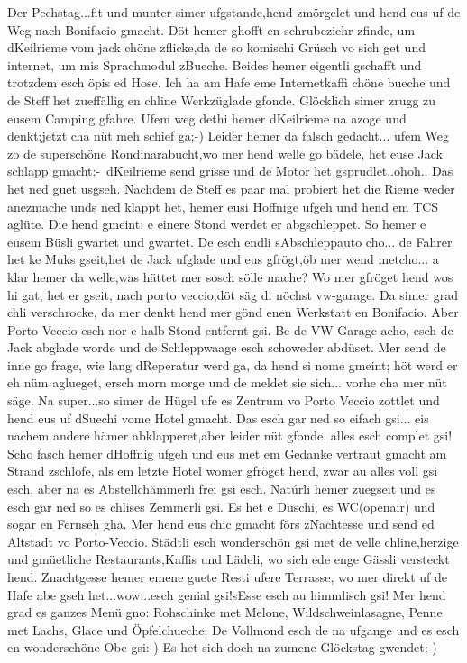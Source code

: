 Der Pechstag...fit und munter simer ufgstande,hend zmörgelet und hend eus uf de Weg nach Bonifacio gmacht.
Döt hemer ghofft en schrubeziehr zfinde, um dKeilrieme vom jack chöne zflicke,da de so komischi Grüsch vo sich get und internet, um mis Sprachmodul zBueche.
Beides hemer eigentli gschafft und trotzdem esch öpis ed Hose.
Ich ha am Hafe eme Internetkaffi chöne bueche und de Steff het zueffällig en chline Werkzüglade gfonde.
Glöcklich simer zrugg zu eusem Camping gfahre.
Ufem weg dethi hemer dKeilrieme na azoge und denkt;jetzt cha nüt meh schief ga;-) Leider hemer da falsch gedacht...
ufem Weg zo de superschöne Rondinarabucht,wo mer hend welle go bädele, het euse Jack schlapp gmacht:-\ dKeilrieme send grisse und de Motor het gsprudlet..ohoh..
Das het ned guet usgseh.
Nachdem de Steff es paar mal probiert het die Rieme weder anezmache unds ned klappt het, hemer eusi Hoffnige ufgeh und hend em TCS aglüte.
Die hend gmeint: e einere Stond werdet er abgschleppet.
So hemer e eusem Büsli gwartet und gwartet.
De esch endli sAbschleppauto cho...
de Fahrer het ke Muks gseit,het de Jack ufglade und eus gfrögt,öb mer wend metcho...
a klar hemer da welle,was hättet mer sosch sölle mache? Wo mer gfröget hend wos hi gat, het er gseit, nach porto veccio,döt säg di nöchst vw-garage.
Da simer grad chli verschrocke, da mer denkt hend mer gönd enen Werkstatt en Bonifacio.
Aber Porto Veccio esch nor e halb Stond entfernt gsi.
Be de VW Garage acho, esch de Jack abglade worde und de Schleppwaage esch schoweder abdüset.
Mer send de inne go frage, wie lang dReperatur werd ga, da hend si nome gmeint; höt werd er eh nüm aglueget, ersch morn morge und de meldet sie sich...
vorhe cha mer nüt säge.
Na super...so simer de Hügel ufe es Zentrum vo Porto Veccio zottlet und hend eus uf dSuechi vome Hotel gmacht.
Das esch gar ned so eifach gsi...
eis nachem andere hämer abklapperet,aber leider nüt gfonde, alles esch complet gsi! Scho fasch hemer dHoffnig ufgeh und eus met em Gedanke vertraut gmacht am Strand zschlofe, als em letzte Hotel womer gfröget hend, zwar au alles voll gsi esch, aber na es Abstellchämmerli frei gsi esch.
Natúrli hemer zuegseit und es esch gar ned so es chlises Zemmerli gsi.
Es het e Duschi, es WC(openair) und sogar en Fernseh gha.
Mer hend eus chic gmacht förs zNachtesse und send ed Altstadt vo Porto-Veccio.
Städtli esch wonderschön gsi met de velle chline,herzige und gmüetliche Restaurants,Kaffis und Lädeli, wo sich ede enge Gässli versteckt hend.
Znachtgesse hemer emene guete Resti ufere Terrasse, wo mer direkt uf de Hafe abe gseh het...wow...esch genial gsi!sEsse esch au himmlisch gsi! Mer hend grad es ganzes Menü gno: Rohschinke met Melone, Wildschweinlasagne, Penne met Lachs, Glace und Öpfelchueche.
De Vollmond esch de na ufgange und es esch en wonderschöne Obe gsi:-) Es het sich doch na zumene Glöckstag gwendet;-)


